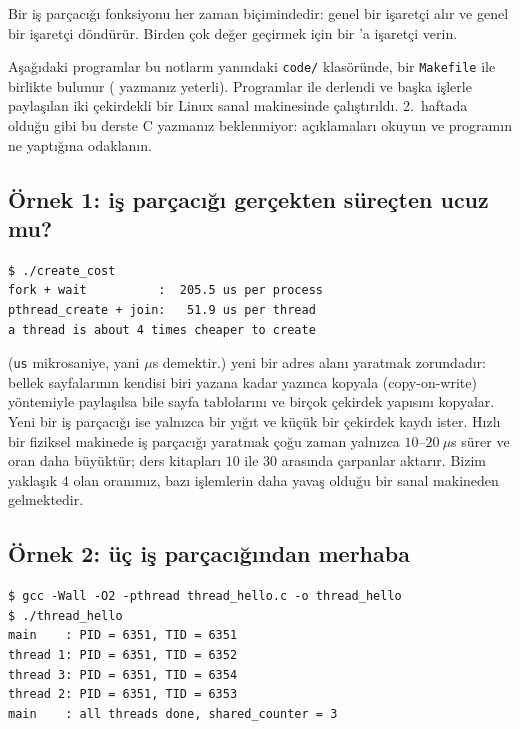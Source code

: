Bir iş parçacığı fonksiyonu her zaman  biçimindedir: genel bir işaretçi alır ve genel bir işaretçi döndürür. Birden çok değer geçirmek için bir 'a işaretçi verin.

Aşağıdaki programlar bu notların yanındaki \texttt{code/} klasöründe, bir \texttt{Makefile} ile birlikte bulunur ( yazmanız yeterli). Programlar  ile derlendi ve başka işlerle paylaşılan iki çekirdekli bir Linux sanal makinesinde çalıştırıldı. 2.~haftada olduğu gibi bu derste C yazmanız beklenmiyor: açıklamaları okuyun ve programın ne yaptığına odaklanın.

\subsection{Örnek 1: iş parçacığı gerçekten süreçten ucuz mu?}
\label{sec:createcost}



\begin{lstlisting}[style=term]
$ ./create_cost
fork + wait          :  205.5 us per process
pthread_create + join:   51.9 us per thread
a thread is about 4 times cheaper to create
\end{lstlisting}

(\texttt{us} mikrosaniye, yani $\mu$s demektir.)  yeni bir adres alanı yaratmak zorundadır: bellek sayfalarının kendisi biri yazana kadar yazınca kopyala (copy-on-write) yöntemiyle paylaşılsa bile sayfa tablolarını ve birçok çekirdek yapısını kopyalar. Yeni bir iş parçacığı ise yalnızca bir yığıt ve küçük bir çekirdek kaydı ister. Hızlı bir fiziksel makinede iş parçacığı yaratmak çoğu zaman yalnızca $10$--$20\ \mu$s sürer ve oran daha büyüktür; ders kitapları $10$ ile $30$ arasında çarpanlar aktarır. Bizim yaklaşık $4$ olan oranımız, bazı işlemlerin daha yavaş olduğu bir sanal makineden gelmektedir.

\subsection{Örnek 2: üç iş parçacığından merhaba}



\begin{lstlisting}[style=term]
$ gcc -Wall -O2 -pthread thread_hello.c -o thread_hello
$ ./thread_hello
main    : PID = 6351, TID = 6351
thread 1: PID = 6351, TID = 6352
thread 3: PID = 6351, TID = 6354
thread 2: PID = 6351, TID = 6353
main    : all threads done, shared_counter = 3
\end{lstlisting}

